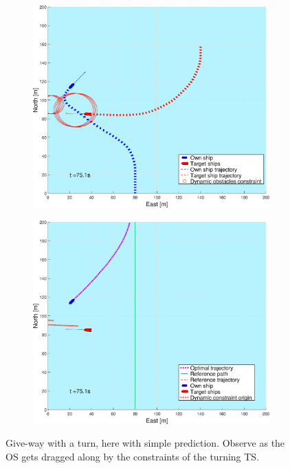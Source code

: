 \begin{figure}[ht!]
\begin{subfigure}[b]{0.494\textwidth}
        \subcaption{}
    \end{subfigure}
    \hfill
    \\
    \begin{subfigure}[b]{0.494\textwidth}
        \centering
        \includegraphics[width=\textwidth]{Images/Figures/sving_GW/_Simple_1fig1_time=75}
        \subcaption{}
    \end{subfigure}
    \hfill
    \begin{subfigure}[b]{0.494\textwidth}
        \centering
        \includegraphics[width=\textwidth]{Images/Figures/sving_GW/_Simple_1fig999_time=75}
        \subcaption{}
    \end{subfigure}
    \hfill
    \caption{Give-way with a turn, here with simple prediction. Observe as the OS gets dragged along by the constraints of the turning TS.}
    \label{FIG: turn GW simple pred}
\end{figure}%
